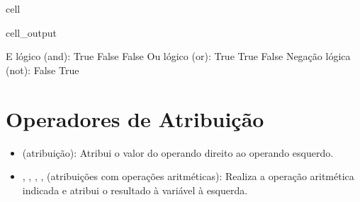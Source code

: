 \documentclass[letterpaper,10pt,english]{jupyterBook}
\begin{document}
\begin{sphinxuseclass}{cell}
\begin{sphinxVerbatimOutput}
\begin{sphinxuseclass}{cell_output}
\begin{sphinxVerbatim}[commandchars=\\\{\}]
E lógico (and): True False False
Ou lógico (or): True True False
Negação lógica (not): False True
\end{sphinxVerbatim}

\end{sphinxuseclass}\end{sphinxVerbatimOutput}

\end{sphinxuseclass}

\section{Operadores de Atribuição}
\label{\detokenize{chapters/ch3/ch3:operadores-de-atribuicao}}\begin{itemize}
\item {} 
\sphinxAtStartPar
\sphinxcode{\sphinxupquote{=}} (atribuição): Atribui o valor do operando direito ao operando esquerdo.

\item {} 
\sphinxAtStartPar
\sphinxcode{\sphinxupquote{+=}}, \sphinxcode{\sphinxupquote{\sphinxhyphen{}=}}, \sphinxcode{\sphinxupquote{*=}}, \sphinxcode{\sphinxupquote{/=}}, \sphinxcode{\sphinxupquote{\%=}} (atribuições com operações aritméticas): Realiza a operação aritmética indicada e atribui o resultado à variável à esquerda.

\end{itemize}
\end{document}
